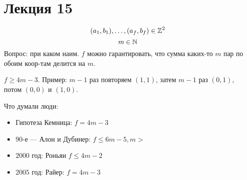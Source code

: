 \section{Лекция 15}
\begin{task}
\[
  (a_1, b_1), \ldots, (a_f, b_f) \in \mathbb{Z}^{2}
\]
\[
m \in \mathbb{N}
\]
Вопрос: при каком наим. $f$ можно гарантировать, что сумма каких-то $m$ пар по обоим коор-там делится на $m$.
\end{task}
\begin{note}
$f \geq 4m - 3$. Пример: $m - 1$ раз повторяем $(1, 1)$, затем $m - 1$ раз $(0, 1)$, потом $(0, 0)$ и $(1, 0)$.
\end{note}
Что думали люди:
\begin{itemize}
  \item Гипотеза Кемница: $f = 4m - 3$
  \item $90$-е --- Алон и Дубинер: $f \leq 6m - 5, m >$
  \item $2000$ год: Роньяи $f \leq 4m - 2$
  \item $2005$ год: Райер: $f = 4m - 3$
\end{itemize}
